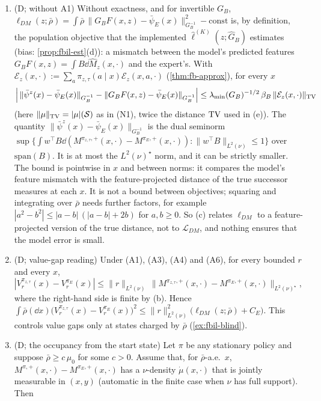 \begin{theorem}
\begin{enumerate}[nosep,label=(\alph*)]
  \[\mathcal L_{DM}(z;\bar\rho)=\int\bar\rho(\dd x)\Big[\|F(x,z)^\top B-\Pi_Bm_E(x,\cdot)\|^2_{L^2(\nu)}+\|m_E(x,\cdot)-\Pi_Bm_E(x,\cdot)\|^2_{L^2(\nu)}\Big]:\]
  DM$_{\mathrm{FB}}$ can only match the projection of the expert's successor density onto $\mathrm{span}(B)$.
\item (\textsf{D}; without A1) Without exactness, and for invertible $G_B$, $\ell_{DM}(z;\bar\rho)=\int\bar\rho\,\|G_BF(x,z)-\bar\psi_E(x)\|^2_{G_B^{-1}}-\mathrm{const}$ is, by definition, the population objective that the implemented $\hat\ell^{(K)}(z;\hat G_B)$ estimates (bias: \cref{prop:fbil-est}(d)): a mismatch between the model's predicted features $G_BF(x,z)=\int B\dd\hat M_z(x,\cdot)$ and the expert's.
  With $\mathcal E_z(x,\cdot):=\sum_a\pi_{z,\tau}(a\mid x)\mathcal E_z(x,a,\cdot)$ (\cref{thm:fb-approx}), for every $x$
  \[
  \Big|\,\|\bar\psi^{z}(x)-\bar\psi_E(x)\|_{G_B^{-1}}-\|G_BF(x,z)-\bar\psi_E(x)\|_{G_B^{-1}}\Big|\le\lambda_{\min}(G_B)^{-1/2}\,\beta_B\,\|\mathcal E_z(x,\cdot)\|_{\mathrm{TV}}
  \]
  (here $\|\mu\|_{\mathrm{TV}}=|\mu|(\mathcal{S})$ as in (N1), twice the distance $\mathrm{TV}$ used in (e)).
  The quantity $\|\bar\psi^{z}(x)-\bar\psi_E(x)\|_{G_B^{-1}}$ is the dual seminorm $\sup\{\int w^\top B\dd(M^{\pi_{z,\tau},+}(x,\cdot)-M^{\pi_E,+}(x,\cdot)):\|w^\top B\|_{L^2(\nu)}\le1\}$ over $\mathrm{span}(B)$. It is at most the $L^2(\nu)^\star$ norm, and it can be strictly smaller.
  The bound is pointwise in $x$ and between norms: it compares the model's feature mismatch with the feature-projected distance of the true successor measures at each $x$. It is not a bound between objectives; squaring and integrating over $\bar\rho$ needs further factors, for example $|a^2-b^2|\le|a-b|\,(|a-b|+2b)$ for $a,b\ge0$.
  So (c) relates $\ell_{DM}$ to a feature-projected version of the true distance, not to $\mathcal L_{DM}$, and nothing ensures that the model error is small.
\item (\textsf{D}; value-gap reading) Under (A1), (A3), (A4) and (A6), for every bounded $r$ and every $x$,
  $|V^{\pi_{z,\tau}}_r(x)-V^{\pi_E}_r(x)|\le\|r\|_{L^2(\nu)}\,\|M^{\pi_{z,\tau},+}(x,\cdot)-M^{\pi_E,+}(x,\cdot)\|_{L^2(\nu)^\star}$, where the right-hand side is finite by (b). Hence
  $\int\bar\rho(\dd x)\big(V^{\pi_{z,\tau}}_r(x)-V^{\pi_E}_r(x)\big)^2\le\|r\|^2_{L^2(\nu)}\big(\ell_{DM}(z;\bar\rho)+C_E\big)$.
  This controls value gaps only at states charged by $\bar\rho$ (\cref{ex:fbil-blind}).
\item (\textsf{D}; the occupancy from the start state) Let $\pi$ be any stationary policy and suppose $\bar\rho\ge c\,\mu_0$ for some $c>0$. Assume that, for $\bar\rho$-a.e.\ $x$, $M^{\pi,+}(x,\cdot)-M^{\pi_E,+}(x,\cdot)$ has a $\nu$-density $\dot\mu(x,\cdot)$ that is jointly measurable in $(x,y)$ (automatic in the finite case when $\nu$ has full support). Then

\end{enumerate}
\end{theorem}
